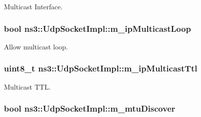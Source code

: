 Multicast Interface. 

\subsubsection[{\texorpdfstring{m\+\_\+ip\+Multicast\+Loop}{m_ipMulticastLoop}}]{\setlength{\rightskip}{0pt plus 5cm}bool ns3\+::\+Udp\+Socket\+Impl\+::m\+\_\+ip\+Multicast\+Loop\hspace{0.3cm}{\ttfamily [private]}}\hypertarget{classns3_1_1UdpSocketImpl_aa201ce3516300da49c3e602e21cd6f6d}{}\label{classns3_1_1UdpSocketImpl_aa201ce3516300da49c3e602e21cd6f6d}


Allow multicast loop. 

\subsubsection[{\texorpdfstring{m\+\_\+ip\+Multicast\+Ttl}{m_ipMulticastTtl}}]{\setlength{\rightskip}{0pt plus 5cm}uint8\+\_\+t ns3\+::\+Udp\+Socket\+Impl\+::m\+\_\+ip\+Multicast\+Ttl\hspace{0.3cm}{\ttfamily [private]}}\hypertarget{classns3_1_1UdpSocketImpl_a4849465356cef8573ed373d12a5a62ec}{}\label{classns3_1_1UdpSocketImpl_a4849465356cef8573ed373d12a5a62ec}


Multicast T\+TL. 

\subsubsection[{\texorpdfstring{m\+\_\+mtu\+Discover}{m_mtuDiscover}}]{\setlength{\rightskip}{0pt plus 5cm}bool ns3\+::\+Udp\+Socket\+Impl\+::m\+\_\+mtu\+Discover\hspace{0.3cm}{\ttfamily [private]}}\hypertarget{classns3_1_1UdpSocketImpl_ab5ae932e01b5746539b9ad20b3ff4f46}{}\label{classns3_1_1UdpSocketImpl_ab5ae932e01b5746539b9ad20b3ff4f46}


